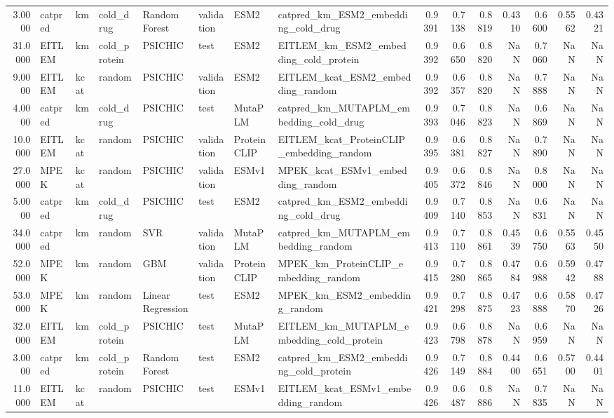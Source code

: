 \begin{tabular}{rlllllllrrrrrrr}
3.0000 & catpred & km & cold_drug & Random Forest & validation & ESM2 & catpred_km_ESM2_embedding_cold_drug & 0.9391 & 0.7138 & 0.8819 & 0.4310 & 0.6600 & 0.5562 & 0.4321 \\
31.0000 & EITLEM & km & cold_protein & PSICHIC & test & ESM2 & EITLEM_km_ESM2_embedding_cold_protein & 0.9392 & 0.6650 & 0.8820 & NaN & 0.7060 & NaN & NaN \\
9.0000 & EITLEM & kcat & random & PSICHIC & validation & ESM2 & EITLEM_kcat_ESM2_embedding_random & 0.9392 & 0.6357 & 0.8820 & NaN & 0.7888 & NaN & NaN \\
4.0000 & catpred & km & cold_drug & PSICHIC & test & MutaPLM & catpred_km_MUTAPLM_embedding_cold_drug & 0.9393 & 0.7046 & 0.8823 & NaN & 0.6869 & NaN & NaN \\
10.0000 & EITLEM & kcat & random & PSICHIC & validation & ProteinCLIP & EITLEM_kcat_ProteinCLIP_embedding_random & 0.9395 & 0.6381 & 0.8827 & NaN & 0.7890 & NaN & NaN \\
27.0000 & MPEK & kcat & random & PSICHIC & validation & ESMv1 & MPEK_kcat_ESMv1_embedding_random & 0.9405 & 0.6372 & 0.8846 & NaN & 0.8000 & NaN & NaN \\
5.0000 & catpred & km & cold_drug & PSICHIC & test & ESM2 & catpred_km_ESM2_embedding_cold_drug & 0.9409 & 0.7140 & 0.8853 & NaN & 0.6831 & NaN & NaN \\
34.0000 & catpred & km & random & SVR & validation & MutaPLM & catpred_km_MUTAPLM_embedding_random & 0.9413 & 0.7110 & 0.8861 & 0.4539 & 0.6750 & 0.5563 & 0.4550 \\
52.0000 & MPEK & km & random & GBM & validation & ProteinCLIP & MPEK_km_ProteinCLIP_embedding_random & 0.9415 & 0.7280 & 0.8865 & 0.4784 & 0.6988 & 0.5942 & 0.4788 \\
53.0000 & MPEK & km & random & Linear Regression & test & ESM2 & MPEK_km_ESM2_embedding_random & 0.9421 & 0.7298 & 0.8875 & 0.4723 & 0.6888 & 0.5870 & 0.4726 \\
32.0000 & EITLEM & km & cold_protein & PSICHIC & test & MutaPLM & EITLEM_km_MUTAPLM_embedding_cold_protein & 0.9423 & 0.6798 & 0.8878 & NaN & 0.6959 & NaN & NaN \\
3.0000 & catpred & km & cold_protein & Random Forest & test & ESM2 & catpred_km_ESM2_embedding_cold_protein & 0.9426 & 0.7149 & 0.8884 & 0.4400 & 0.6651 & 0.5700 & 0.4401 \\
11.0000 & EITLEM & kcat & random & PSICHIC & test & ESMv1 & EITLEM_kcat_ESMv1_embedding_random & 0.9426 & 0.6487 & 0.8886 & NaN & 0.7835 & NaN & NaN \\

\end{tabular}
